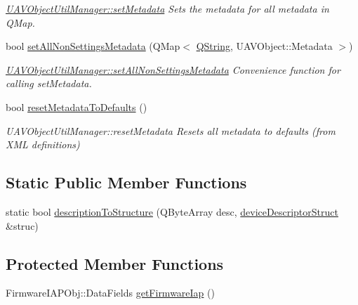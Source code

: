 \begin{DoxyCompactItemize}
\begin{DoxyCompactList}\small\item\em \hyperlink{group___u_a_v_object_util_plugin_gab813cc6401727303f0787527bbd29ad1}{\-U\-A\-V\-Object\-Util\-Manager\-::set\-Metadata} \-Sets the metadata for all metadata in \-Q\-Map. \end{DoxyCompactList}\item 
bool \hyperlink{group___u_a_v_object_util_plugin_gaaa6258eb268dae068887432d5efcfa6c}{set\-All\-Non\-Settings\-Metadata} (\-Q\-Map$<$ \hyperlink{group___u_a_v_objects_plugin_gab9d252f49c333c94a72f97ce3105a32d}{\-Q\-String}, \-U\-A\-V\-Object\-::\-Metadata $>$)
\begin{DoxyCompactList}\small\item\em \hyperlink{group___u_a_v_object_util_plugin_gaaa6258eb268dae068887432d5efcfa6c}{\-U\-A\-V\-Object\-Util\-Manager\-::set\-All\-Non\-Settings\-Metadata} \-Convenience function for calling set\-Metadata. \end{DoxyCompactList}\item 
bool \hyperlink{group___u_a_v_object_util_plugin_ga8fadd2e0c6ed3b69a1f8059d2c98054c}{reset\-Metadata\-To\-Defaults} ()
\begin{DoxyCompactList}\small\item\em \-U\-A\-V\-Object\-Util\-Manager\-::reset\-Metadata \-Resets all metadata to defaults (from \-X\-M\-L definitions) \end{DoxyCompactList}\end{DoxyCompactItemize}
\subsection*{\-Static \-Public \-Member \-Functions}
\begin{DoxyCompactItemize}
\item 
static bool \hyperlink{group___u_a_v_objects_plugin_ga31c6b739ad7f06472a3f3386e4bebd8a}{description\-To\-Structure} (\-Q\-Byte\-Array desc, \hyperlink{classdevice_descriptor_struct}{device\-Descriptor\-Struct} \&struc)
\end{DoxyCompactItemize}
\subsection*{\-Protected \-Member \-Functions}
\begin{DoxyCompactItemize}
\item 
\-Firmware\-I\-A\-P\-Obj\-::\-Data\-Fields \hyperlink{group___u_a_v_object_util_plugin_gabd93ae6b2c3ecb8444184c8aaf2176bb}{get\-Firmware\-Iap} ()
\end{DoxyCompactItemize}


